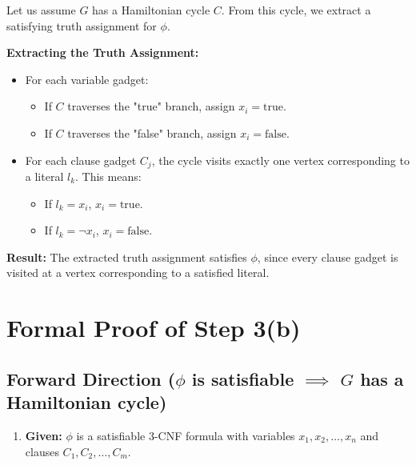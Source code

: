 \documentclass[10pt,letter,notitlepage]{article}
\begin{document}
\begin{Answer}
Let us assume \(G\) has a Hamiltonian cycle \(C\). From this cycle, we extract a satisfying truth assignment for \(\phi\).

\textbf{Extracting the Truth Assignment:}

\begin{itemize}
    \item For each variable gadget:
    \begin{itemize}
        \item If \(C\) traverses the "true" branch, assign \(x_i = \text{true}\).
        \item If \(C\) traverses the "false" branch, assign \(x_i = \text{false}\).
    \end{itemize}
    \item For each clause gadget \(C_j\), the cycle visits exactly one vertex corresponding to a literal \(l_k\). This means:
    \begin{itemize}
        \item If \(l_k = x_i\), \(x_i = \text{true}\).
        \item If \(l_k = \neg x_i\), \(x_i = \text{false}\).
    \end{itemize}
\end{itemize}

\textbf{Result:}
The extracted truth assignment satisfies \(\phi\), since every clause gadget is visited at a vertex corresponding to a satisfied literal.

\section*{Formal Proof of Step 3(b)}

\subsection*{Forward Direction (\(\phi\) is satisfiable \(\implies\) \(G\) has a Hamiltonian cycle)}

\begin{enumerate}
    \item \textbf{Given:} \(\phi\) is a satisfiable 3-CNF formula with variables \(x_1, x_2, \ldots, x_n\) and clauses \(C_1, C_2, \ldots, C_m\).


\end{enumerate}
\end{Answer}
\end{document}
